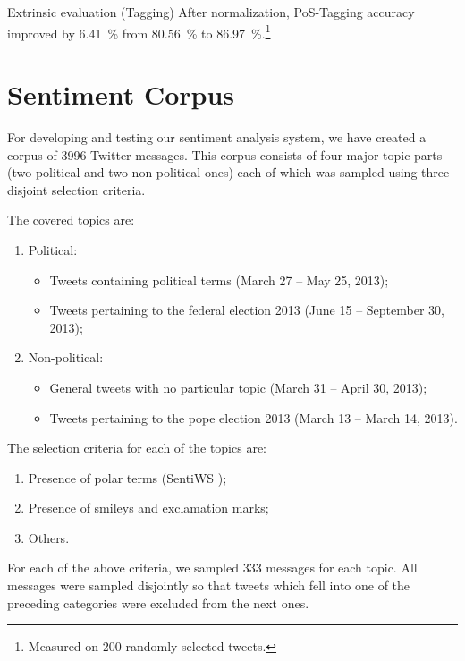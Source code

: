 \documentclass{beamer}
\begin{document}
\begin{frame}{Extrinsic evaluation (Tagging)}
After normalization, PoS-Tagging accuracy improved by 6.41~\% from 80.56~\% to
86.97~\%.\footnote{Measured on 200 randomly selected tweets.}
\end{frame}


\section{Sentiment Corpus}
\begin{frame}{\insertsection}
  For developing and testing our sentiment analysis system, we have created a
  corpus of 3996 Twitter messages.  This corpus consists of four major topic
  parts (two political and two non-political ones) each of which was sampled
  using three disjoint selection criteria.
\end{frame}

\begin{frame}{}
  The covered topics are:
  \begin{enumerate}
  \item Political:
    \begin{itemize}
    \item Tweets containing political terms {\tiny(March 27 --
      May 25, 2013)};
    \item Tweets pertaining to the federal election 2013
      {\tiny(June 15 -- September 30, 2013)};
    \end{itemize}

  \item Non-political:
    \begin{itemize}
    \item General tweets with no particular topic {\tiny(March
      31 -- April 30, 2013)};
    \item Tweets pertaining to the pope election 2013
      {\tiny(March 13 -- March 14, 2013)}.
    \end{itemize}
  \end{enumerate}
\end{frame}

\begin{frame}{}
  The selection criteria for each of the topics are:
  \begin{enumerate}
  \item Presence of polar terms (SentiWS \cite{Remus-10});
  \item Presence of smileys and exclamation marks;
  \item Others.
  \end{enumerate}
  For each of the above criteria, we sampled 333 messages for each
  topic.  All messages were sampled disjointly so that tweets
  which fell into one of the preceding categories were excluded
  from the next ones.
\end{frame}
\end{document}
